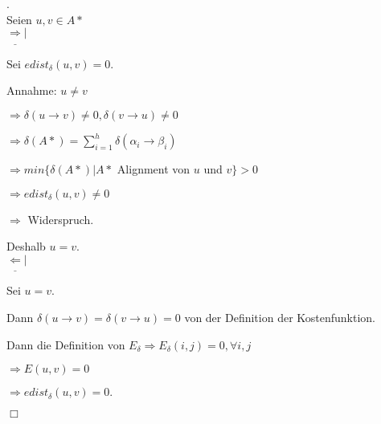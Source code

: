 \documentclass[11pt,a4paper]{article}
\begin{document}
. \\
Seien $ u,v \in A* $\\
$\underline \Rightarrow | $

Sei $ edist_\delta(u,v) = 0. $ 

Annahme: $ u \ne v $ 

\indent \indent $ \Rightarrow \delta(u \to v) \ne 0, \delta(v \to u) \ne 0 $

\indent \indent $ \Rightarrow \delta(A*) = \sum_{i=1}^{h}  \delta(\alpha_i \to \beta_i) $

\indent \indent $ \Rightarrow min\{\delta(A*) | A* $ Alignment von $ u $ und $ v \} > 0 $

\indent \indent $ \Rightarrow edist_\delta(u,v) \ne 0 $

\indent \indent $ \Rightarrow $ Widerspruch.

Deshalb $ u = v. $ \\



$ \underline \Leftarrow | $

Sei $ u = v. $

Dann $ \delta(u \to v) = \delta(v \to u) = 0 $ von der Definition der Kostenfunktion.

Dann die Definition von $ E_\delta \Rightarrow E_\delta(i,j) = 0 ,  \forall i,j $

\indent \indent $ \Rightarrow E(u,v) = 0 $

\indent \indent $ \Rightarrow edist_\delta(u,v) = 0. $

 \par{\raggedright\texttt{}}
\hfill $  \Box $\\
	

	
\end{document}
